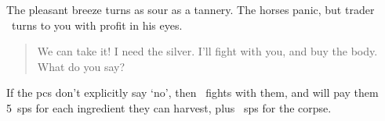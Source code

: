 \assignHumanName

\begin{boxtext}
  The pleasant breeze turns as sour as a tannery.  The horses panic, but trader
  \currentName\ turns to you with profit in his eyes.

  \begin{quotation}
  We can take it!  I need the silver.  I'll fight with you, and buy the body.
  What do you say?
  \end{quotation}
\end{boxtext}

\basilisk

If the \glspl{pc} don't explicitly say `no', then \currentName\ fights with
them, and will pay them 5~\glspl{sp} for each \gls{ingredient} they can
harvest, plus ~\glspl{sp} for the corpse.


